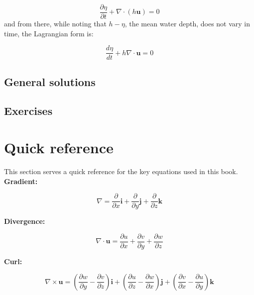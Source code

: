 \documentclass[12pt]{article}
\numberwithin{equation}{section}
\numberwithin{figure}{section}
\numberwithin{table}{section}
\begin{document}
\begin{equation}
  \frac{\partial \eta}{\partial t} + \nabla \cdot (h \mathbf{u}) = 0
  \label{eq:shallow_water_continuity2}
\end{equation}
and from there, while noting that $h - \eta$, the mean water depth, does not vary
in time, the Lagrangian form is:

\begin{equation}
  \frac{d \eta}{dt} + h \nabla \cdot \mathbf{u} = 0
  \label{eq:shallow_water_continuity3}
\end{equation}

\subsection{General solutions}

\subsection{Exercises}


\newpage
\appendix

\section{Quick reference}

This section serves a quick reference for the key equations used in this book.\\

\textbf{Gradient:}

\begin{equation}
  \nabla = \frac{\partial}{\partial x} \mathbf{i} + \frac{\partial}{\partial y} \mathbf{j} + \frac{\partial}{\partial z} \mathbf{k}
\end{equation}

\textbf{Divergence:}

\begin{equation}
  \nabla \cdot \mathbf{u} = \frac{\partial u}{\partial x} + \frac{\partial v}{\partial y} + \frac{\partial w}{\partial z}
\end{equation}

\textbf{Curl:}

\begin{equation}
  \nabla \times \mathbf{u} = \left( \frac{\partial w}{\partial y} - \frac{\partial v}{\partial z} \right) \mathbf{i} + \left( \frac{\partial u}{\partial z} - \frac{\partial w}{\partial x} \right) \mathbf{j} + \left( \frac{\partial v}{\partial x} - \frac{\partial u}{\partial y} \right) \mathbf{k}
\end{equation}
\end{document}
